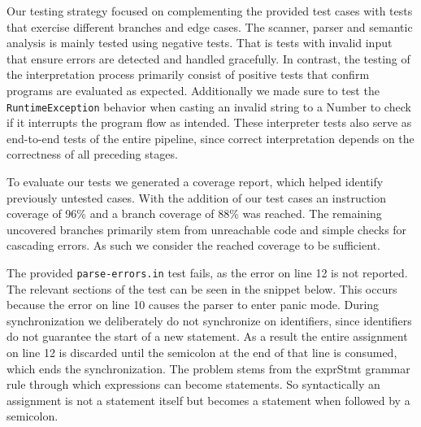 Our testing strategy focused on complementing the provided test cases with tests that exercise different branches and edge cases.
The scanner, parser and semantic analysis is mainly tested using negative tests. That is tests with invalid input that ensure
errors are detected and handled gracefully.
In contrast, the testing of the interpretation process primarily consist of positive tests that confirm
programs are evaluated as expected. 
Additionally we made sure to test the \verb|RuntimeException| behavior when casting an invalid string to a Number to check 
if it interrupts the program flow as intended.
These interpreter tests also serve as end-to-end tests of the entire pipeline, 
since correct interpretation depends on the correctness of all preceding stages.

To evaluate our tests we generated a coverage report, which helped identify previously untested cases.
With the addition of our test cases an instruction coverage of 96\% and a branch coverage of 88\% was reached.
The remaining uncovered branches primarily stem from unreachable code and simple checks for cascading errors. 
As such we consider the reached coverage to be sufficient.

The provided \texttt{parse-errors.in} test fails, as the error on line 12 is not reported.
The relevant sections of the test can be seen in the snippet below.
This occurs because the error on line 10 causes the parser to enter panic mode.
During synchronization we deliberately do not synchronize on identifiers, since identifiers
do not guarantee the start of a new statement. As a result the entire assignment on line 12
is discarded until the semicolon at the end of that line is consumed, which ends the synchronization.
The problem stems from the exprStmt grammar rule through which expressions can become statements.
So syntactically an assignment is not a statement itself but becomes a statement when followed by a semicolon.

